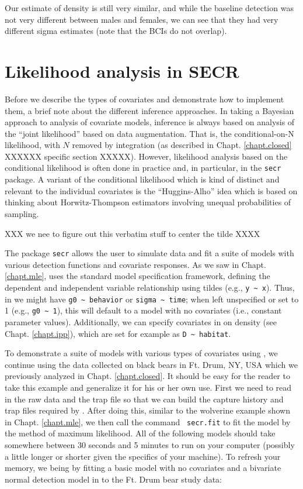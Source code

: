 Our estimate of density is still very similar, and while the baseline detection was not very different
between males and females, we can see that they had very different sigma estimates (note that the BCIs do not
overlap).  




\section{Likelihood analysis in SECR}

Before we describe the types of covariates and demonstrate how to
implement them, a brief note about the different inference approaches.
In taking a Bayesian approach to analysis of covariate models,
inference is always based on analysis of the ``joint likelihood''
based on data augmentation. That is, the conditional-on-N likelihood,
with $N$ removed by integration (as described in
Chapt. \ref{chapt.closed} XXXXXX specific section XXXXX).
However, likelihood analysis
based on the conditional likelihood is often done in practice and, in
particular, in the {\tt secr} package.  A variant of the conditional
likelihood which is kind of distinct and relevant to the individual
covariates is the ``Huggins-Alho'' idea which is based on thinking
about Horwitz-Thompson estimators involving unequal probabilities of
sampling.



XXX we nee to figure out this verbatim stuff to center the tilde XXXX

The package \mbox{\tt secr} allows the user to simulate data and fit a
suite of models with various detection functions and covariate
responses.  As we saw in Chapt. \ref{chapt.mle}, \secr uses the standard \R model
specification framework, defining the dependent and independent
variable relationship using tildes
(e.g., \Verb+y ~ x+).
Thus, in \secr we
might have \verb+g0 ~ behavior+ or \verb+sigma ~ time+;
when left unspecified or set
to 1 (e.g., \verb+g0 ~ 1+), this will default to a model with no
covariates
(i.e., constant parameter values).
Additionally, we can specify covariates in \secr
on density (see Chapt. \ref{chapt.ipp}),
which are set for example as \verb+D ~ habitat+.

To demonstrate
a suite of models with various types of covariates using \secr, we
continue using the data collected on black bears in Ft. Drum, NY, USA
which we previously analyzed in Chapt. \ref{chapt.closed}.
It should be easy for the reader to take this example and generalize
it for his or her own use.  First we need to read in the raw data and
the trap file so that we can build the capture history and trap files
required by \secr.  After doing this, similar to the wolverine example
shown in Chapt. \ref{chapt.mle}, we then call the command \mbox{\tt
  secr.fit}
to fit the model by the method of maximum likelihood.
 All of the following models should take somewhere between 30
seconds and 5 minutes to run on your computer (possibly a little
longer or shorter given the specifics of your machine).  To refresh
your memory, we being by fitting a basic
model with no covariates and a bivariate normal detection model in
\secr to the Ft. Drum bear study data:

